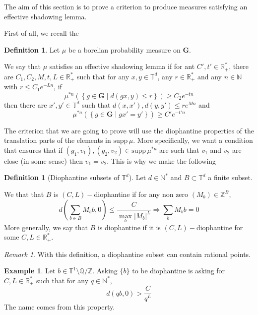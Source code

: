 \documentclass[11pt]{amsart}
\theoremstyle{definition}
\newtheorem{definition}[theorem]{Definition}
\newtheorem{example}[theorem]{Example}
\theoremstyle{remark}
\newtheorem{remark}[theorem]{Remark}
\numberwithin{equation}{section}
\begin{document}
The aim of this section is to prove a criterion to produce measures satisfying an effective shadowing lemma.

First of all, we recall the
\begin{definition}
Let $\mu$ be a borelian probability measure on ${\mathbf G}$.

We say that $\mu$ satisfies an effective shadowing lemma if for ant $C',t' \in {\mathbb R}_+^\ast$, there are $C_1,C_2,M,t,L \in {\mathbb R}_+^\ast$ such that for any $x,y\in {\mathbb T}^d$, any $r\in {\mathbb R}_+^\ast$ and any $n\in {\mathbb N}$ with $r\leqslant C_1e^{-Ln}$, if
\[
\mu^{\ast n} \left(\left\{ g\in {\mathbf G}\middle| d(gx,y) \leqslant r \right\}\right) \geqslant C_2 e^{-t n}
\]
then there are $x',y'\in {\mathbb T}^d$ such that $d(x,x'),d(y,y')\leqslant re^{Mn}$ and
\[
\mu^{\ast n} \left(\left\{ g\in {\mathbf G}\middle| gx'=y'\right\}\right)\geqslant C'e^{-t'n}
\]
\end{definition}

The criterion that we are going to prove will use the diophantine properties of the translation parts of the elements in ${\mathrm{supp}\,}\mu$. More specifically, we want a condition that ensures that if $(g_1,v_1), (g_2,v_2)\in {\mathrm{supp}\,}\mu^{\ast n}$ are such that $v_1$ and $v_2$ are close (in some sense) then $v_1=v_2$. This is why we make the following 

\begin{definition}[Diophantine subsets of ${\mathbb T}^d$]\label{definition:mesures_diophantiennes}
Let $d\in {\mathbb N}^\ast$ and $B\subset {\mathbb T}^d$ a finite subset.

We that that $B$ is $(C,L)-$diophantine if for any non zero $(M_b)\in {\mathbb Z}^B$,
\[
d\left(\sum_{b\in B} M_b b,0\right)\leqslant \frac{ C}{\max_b |M_b|^{L}} \Rightarrow \sum_b M_b b=0
\]
More generally, we say that $B$ is diophantine if it is $(C,L)-$diophantine for some $C,L\in {\mathbb R}_+^\ast$.
\end{definition}

\begin{remark}
With this definition, a diophantine subset can contain rational points.
\end{remark}

\begin{example}\label{exemple:element_diophantien}
Let $b\in {\mathbb T}^1 \setminus{\mathbb Q}/{\mathbb Z}$. Asking $\{b\}$ to be diophantine is asking for $C,L\in {\mathbb R}_+^\ast$ such that for any $q\in {\mathbb N}^\ast$,
\[
d(qb,0) >\frac{ C}{q^L}
\]
The name comes from this property.
\end{example}
\end{document}
